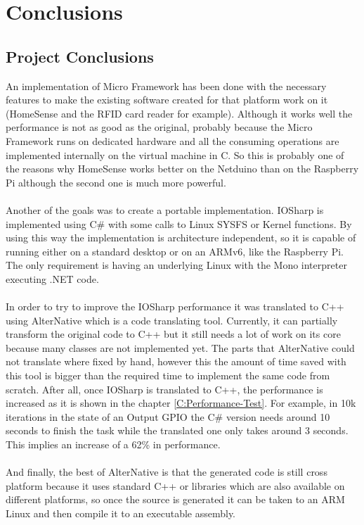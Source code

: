 \chapter{Conclusions}\label{C:Conclusions}
\section{Project Conclusions}\label{S:Project-Conclusions}
An implementation of Micro Framework has been done with the necessary features to make the existing software created for that platform work on it (HomeSense and the RFID card reader for example). Although it works well the performance is not as good as the original, probably because the Micro Framework runs on dedicated hardware and all the consuming operations are implemented internally on the virtual machine in C. So this is probably one of the reasons why HomeSense works better on the Netduino than on the Raspberry Pi although the second one is much more powerful.
\\
\\
Another of the goals was to create a portable implementation. IOSharp is implemented using C\# with some calls to Linux SYSFS or Kernel functions. By using this way the implementation is architecture independent, so it is capable of running either on a standard desktop or on an ARMv6, like the Raspberry Pi. The only requirement is having an underlying Linux with the Mono interpreter executing .NET code.
\\
\\
In order to try to improve the IOSharp performance it was translated to C++ using AlterNative which is a code translating tool. Currently, it can partially transform the original code to C++ but it still needs a lot of work on its core because many classes are not implemented yet. The parts that AlterNative could not translate where fixed by hand, however this the amount of time saved with this tool is bigger than the required time to implement the same code from scratch. After all, once IOSharp is translated to C++, the performance is increased as it is shown in the chapter \ref{C:Performance-Test}. For example, in 10k iterations in the state of an Output GPIO the C\# version needs around 10 seconds to finish the task while the translated one only takes around 3 seconds. This implies an increase of a 62\% in performance.
\\
\\
And finally, the best of AlterNative is that the generated code is still cross platform because it uses standard C++ or libraries which are also available on different platforms, so once the source is generated it can be taken to an ARM Linux and then compile it to an executable assembly.


